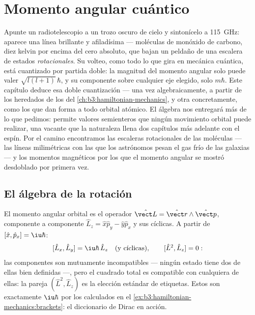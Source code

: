 \chapter{Momento angular cuántico}\label{ch:b3:quantum-angular-momentum}

Apunte un radiotelescopio a un trozo oscuro de cielo y sintonícelo a
\qty{115}{GHz}: aparece una línea brillante y afiladísima --- moléculas de
monóxido de carbono, diez kelvin por encima del cero absoluto, que bajan un
peldaño de una escalera de estados \emph{rotacionales}. Su volteo, como todo
lo que gira en mecánica cuántica, está cuantizado por partida doble: la
magnitud del momento angular solo puede valer
$\sqrt{l(l+1)}\,\hbar$, y su componente sobre cualquier eje elegido, solo
$m\hbar$. Este capítulo deduce esa doble cuantización --- una vez
algebraicamente, a partir de los  heredados de los  del \cref{ch:b3:hamiltonian-mechanics}, y otra concretamente, como
los  que dan forma a todo orbital atómico. El álgebra nos
entregará más de lo que pedimos: permite valores semienteros que ningún
movimiento orbital puede realizar, una vacante que la naturaleza llena dos
capítulos más adelante con el espín. Por el camino encontramos las escaleras
rotacionales de las moléculas --- las líneas milimétricas con las que los
astrónomos pesan el gas frío de las galaxias --- y los momentos magnéticos
por los que el momento angular se mostró desdoblado por primera vez.

\section{El álgebra de la rotación}

\begin{definition}\label{def:b3:quantum-angular-momentum:operators}
El momento angular orbital es el operador $\hat{\vect L} =
\hat{\vect r}\wedge\hat{\vect p}$, componente a componente $\hat L_z = \hat
x\hat p_y - \hat y\hat p_x$ y sus cíclicas. A partir de $[\hat x, \hat p_x] =
\iu\hbar$:
\[
[\hat L_x, \hat L_y] = \iu\hbar\,\hat L_z
\quad\text{(y cíclicas)} , \qquad
[\hat L^2, \hat L_z] = 0 :
\]
las componentes son mutuamente incompatibles --- ningún estado tiene dos de
ellas bien definidas ---, pero el cuadrado total es compatible con
cualquiera de ellas: la pareja $(\hat L^2, \hat L_z)$ es la elección estándar
de etiquetas. Estos  son exactamente $\iu\hbar$ por los
 calculados en el \cref{ex:b3:hamiltonian-mechanics:brackets}:
el diccionario de Dirac en acción.
\end{definition}

